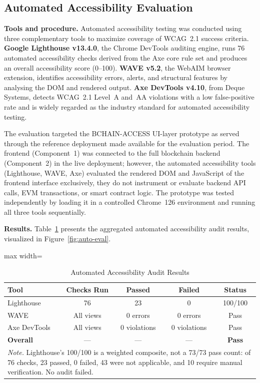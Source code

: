 \documentclass[journal,onecolumn]{IEEEtran}
\begin{document}
\subsection{Automated Accessibility Evaluation}
\label{subsec:auto-evaluation}

\noindent\textbf{Tools and procedure.} 
Automated accessibility testing was conducted using three complementary
tools to maximize coverage of WCAG~2.1 success criteria. \textbf{Google Lighthouse v13.4.0}, the Chrome DevTools auditing engine, runs 76 automated accessibility checks derived from the Axe core rule set and produces an overall accessibility score (0--100). \textbf{WAVE v5.2}, the WebAIM browser extension, identifies accessibility errors, alerts, and structural features by analysing the DOM and rendered output. \textbf{Axe DevTools v4.10}, from Deque Systems, detects WCAG~2.1 Level~A and~AA violations with a low false-positive rate and is widely regarded as the industry standard for automated accessibility testing.

The evaluation targeted the BCHAIN-ACCESS UI-layer prototype as served through the reference deployment made available for the evaluation period. The frontend (Component~1) was connected to the full blockchain backend (Component~2) in the live deployment; however, the automated accessibility tools (Lighthouse, WAVE, Axe) evaluated the rendered DOM and JavaScript of the frontend interface exclusively, they do not instrument or evaluate backend API calls, EVM transactions, or smart contract logic. The prototype was tested independently by loading it in a controlled Chrome~126 environment and running all three tools sequentially.

\noindent\textbf{Results.} 
Table~\ref{tab:auto-audit} presents the aggregated automated accessibility
audit results, visualized in Figure~\ref{fig:auto-eval}.

\begin{table}[htbp]
\centering
\caption{Automated Accessibility Audit Results}
\label{tab:auto-audit}
\small
\begin{adjustbox}{max width=\columnwidth}
\begin{tabular}{|p{1.8cm}|c|c|c|c|}
\hline
\textbf{Tool} & \textbf{Checks Run} & \textbf{Passed} & \textbf{Failed} & \textbf{Status} \\
\hline
Lighthouse & 76 & 23 & 0 & 100/100 \\
\hline
WAVE & All views & 0 errors & 0 errors & Pass \\
\hline
Axe DevTools & All views & 0 violations & 0 violations & Pass \\
\hline
\textbf{Overall} & --- & --- & --- & \textbf{Pass} \\
\hline
\multicolumn{5}{p{8.4cm}}{\footnotesize\textit{Note.} Lighthouse's 100/100 is a weighted composite, not a 73/73 pass count: of 76 checks, 23 passed, 0 failed, 43 were not applicable, and 10 require manual verification. No audit failed.}
\end{tabular}
\end{adjustbox}
\end{table}
\end{document}
